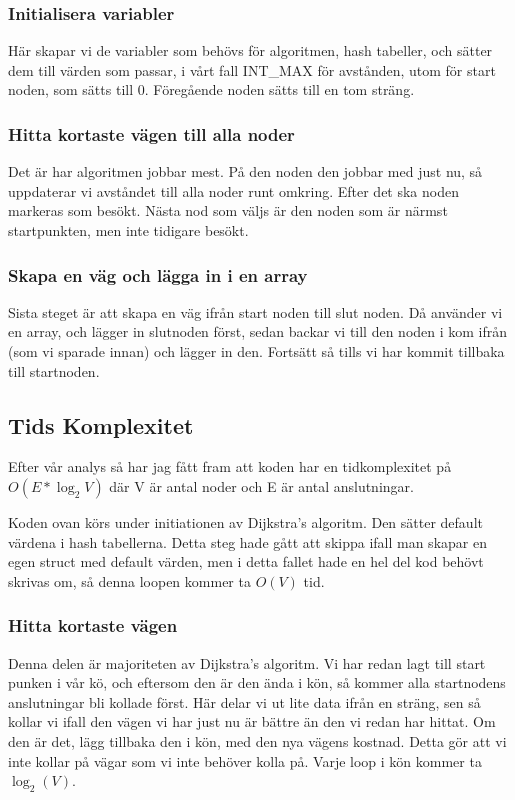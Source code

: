 \documentclass[fleqn,10pt]{article}
\begin{document}
\subsubsection{Initialisera variabler}
Här skapar vi de variabler som behövs för algoritmen, hash tabeller, och sätter dem till värden som passar, i vårt fall INT\_MAX för avstånden, utom för start noden, som sätts till 0. Föregående noden sätts till en tom sträng.
\subsubsection{Hitta kortaste vägen till alla noder}
Det är har algoritmen jobbar mest. På den noden den jobbar med just nu, så uppdaterar vi avståndet till alla noder runt omkring. Efter det ska noden markeras som besökt. Nästa nod som väljs är den noden som är närmst startpunkten, men inte tidigare besökt.
\subsubsection{Skapa en väg och lägga in i en array}
Sista steget är att skapa en väg ifrån start noden till slut noden. Då använder vi en array, och lägger in slutnoden först, sedan backar vi till den noden i kom ifrån (som vi sparade innan) och lägger in den. Fortsätt så tills vi har kommit tillbaka till startnoden.

\subsection{Tids Komplexitet}
Efter vår analys så har jag fått fram att koden har en tidkomplexitet på $ O(E*\log_2{V})$ där V är antal noder och E är antal anslutningar.

Koden ovan körs under initiationen av Dijkstra's algoritm. Den sätter default värdena i hash tabellerna. Detta steg hade gått att skippa ifall man skapar en egen struct med default värden, men i detta fallet hade en hel del kod behövt skrivas om, så denna loopen kommer ta $O(V)$ tid.

\subsubsection{Hitta kortaste vägen}
Denna delen är majoriteten av Dijkstra's algoritm. Vi har redan lagt till start punken i vår kö, och eftersom den är den ända i kön, så kommer alla startnodens anslutningar bli kollade först. Här delar vi ut lite data ifrån en sträng, sen så kollar vi ifall den vägen vi har just nu är bättre än den vi redan har hittat. Om den är det, lägg tillbaka den i kön, med den nya vägens kostnad. Detta gör att vi inte kollar på vägar som vi inte behöver kolla på. Varje loop i kön kommer ta $\log_2(V)$.
\end{document}
